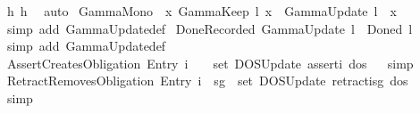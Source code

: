 \begin{isabellebody}
\ h{}\ h{}\ \isamarkupfalse%
\ auto\isanewline
{}\isamarkupfalse%
\isanewline
\isanewline
%
%
\endisatagproof
{\isafoldproof}%
%
\isadelimproof
\isanewline
%
\endisadelimproof
{}\isamarkupfalse%
\ GammaMono{\isacharcolon}{\kern0pt}\ {\isachardoublequoteopen}{\isasymlbrakk}{\isasymGamma}\ x{\isacharsemicolon}{\kern0pt}\ GammaKeep\ l\ x{\isasymrbrakk}\ {\isasymLongrightarrow}\ GammaUpdate\ l\ {\isasymGamma}\ x{\isachardoublequoteclose}\isanewline
%
\isadelimproof
\ \ %
\endisadelimproof
%
\isatagproof
{}\isamarkupfalse%
\ {\isacharparenleft}{\kern0pt}simp\ add{\isacharcolon}{\kern0pt}\ GammaUpdate{\isacharunderscore}{\kern0pt}def{\isacharparenright}{\kern0pt}%
\endisatagproof
{\isafoldproof}%
%
\isadelimproof
\isanewline
%
\endisadelimproof
{}\isamarkupfalse%
\ DoneRecorded{\isacharcolon}{\kern0pt}\ {\isachardoublequoteopen}GammaUpdate\ l\ {\isasymGamma}\ {\isacharparenleft}{\kern0pt}Done\isactrlsup d\ l{\isacharparenright}{\kern0pt}{\isachardoublequoteclose}%
\isadelimproof
\ %
\endisadelimproof
%
\isatagproof
{}\isamarkupfalse%
\ {\isacharparenleft}{\kern0pt}simp\ add{\isacharcolon}{\kern0pt}\ GammaUpdate{\isacharunderscore}{\kern0pt}def{\isacharparenright}{\kern0pt}%
\endisatagproof
{\isafoldproof}%
%
\isadelimproof
%
\endisadelimproof
\isanewline
{}\isamarkupfalse%
\ AssertCreatesObligation{\isacharcolon}{\kern0pt}\ {\isachardoublequoteopen}{\isacharparenleft}{\kern0pt}Entry\ i\ {\isasymphi}\ {\isasymoplus}{\isacharparenright}{\kern0pt}\ {\isasymin}\ set\ {\isacharparenleft}{\kern0pt}DOSUpdate\ assert{\isacharbrackleft}{\kern0pt}i{\isacharcomma}{\kern0pt}{\isasymphi}{\isacharbrackright}{\kern0pt}\ dos{\isacharparenright}{\kern0pt}{\isachardoublequoteclose}%
\isadelimproof
\ %
\endisadelimproof
%
\isatagproof
{}\isamarkupfalse%
\ simp%
\endisatagproof
{\isafoldproof}%
%
\isadelimproof
%
\endisadelimproof
\isanewline
{}\isamarkupfalse%
\ RetractRemovesObligation{\isacharcolon}{\kern0pt}\ {\isachardoublequoteopen}{\isacharparenleft}{\kern0pt}Entry\ i\ {\isasymphi}\ sg{\isacharparenright}{\kern0pt}\ {\isasymnotin}\ set\ {\isacharparenleft}{\kern0pt}DOSUpdate\ retract{\isacharbrackleft}{\kern0pt}i{\isacharcomma}{\kern0pt}{\isasymphi}{\isacharcomma}{\kern0pt}sg{\isacharbrackright}{\kern0pt}\ dos{\isacharparenright}{\kern0pt}{\isachardoublequoteclose}%
\isadelimproof
\ %
\endisadelimproof
%
\isatagproof
{}\isamarkupfalse%
\ simp%
\endisatagproof
{\isafoldproof}%
%
\isadelimproof
%
\endisadelimproof
\isanewline
%
\isadelimtheory
\isanewline
%
\endisadelimtheory
%
\isatagtheory
{}\isamarkupfalse%
%
\endisatagtheory
{\isafoldtheory}%
%
\isadelimtheory
%
\endisadelimtheory
%
\end{isabellebody}%
